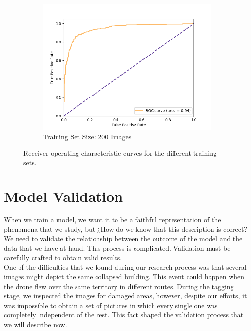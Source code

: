 \begin{figure}[ht]
\begin{subfigure}{.49\textwidth}
        \includegraphics[width=\textwidth]{images/score-100-roc.png}
        \caption{Training Set Size: 200 Images}
    \end{subfigure}
  
  \caption{Receiver operating characteristic curves for the different training sets.}
  \label{fig:whatever}
\end{figure}


\section{Model Validation}

When we train a model, we want it to be a faithful representation of the phenomena that we study, but ¿How do we know that this description is correct? We need to validate the relationship between the outcome of the model and the data that we have at hand. This process is complicated. Validation must be carefully crafted to obtain valid results.\\

One of the difficulties that we found during our research process was that several images might depict the same collapsed building. 
This event could happen when the drone flew over the same territory in different routes. During the tagging stage, we inspected the images for damaged areas, however, despite our efforts, it was impossible to obtain a set of pictures in which every single one was completely independent of the rest. This fact shaped the validation process that we will describe now.\\

